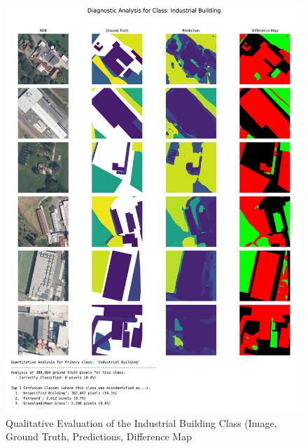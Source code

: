 \documentclass{report}
\begin{document}
\begin{figure}
    \centering
    \includegraphics[width=1.2\linewidth]{own_images/low_res_greater_100_sqm_diagnostic_3_Industrial Building.jpg}
    \caption{Qualitative Evaluation of the Industrial Building Class (Image, Ground Truth, Predictions, Difference Map}
    \label{fig:qual_eval_industrial_building}
\end{figure}
\end{document}
